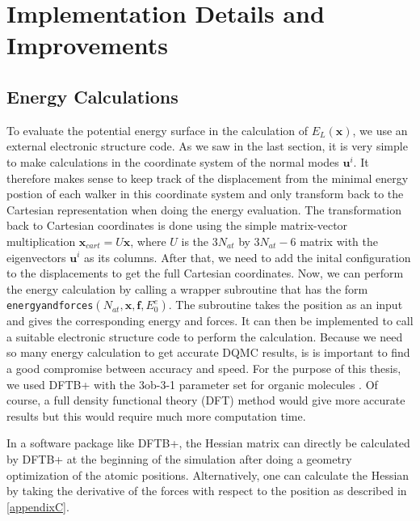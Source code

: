 \documentclass [12pt]{report}
\begin{document}
\section{Implementation Details and Improvements}
\subsection{Energy Calculations}
To evaluate the potential energy surface in the calculation of $E_L(\bm{x})$, we use an external electronic structure code. As we saw in the last section, it is very simple to make calculations in the coordinate system of the normal modes $\bm{u}^i$. It therefore makes sense to keep track of the displacement from the minimal energy postion of each walker in this coordinate system and only transform back to the Cartesian representation when doing the energy evaluation. The transformation back to Cartesian coordinates is done using the simple matrix-vector multiplication $\bm{x}_{cart} = U\bm{x}$, where $U$ is the $3N_{at}$ by $3N_{at} - 6$ matrix with the eigenvectors $\bm{u}^i$ as its columns. After that, we need to add the inital configuration to the displacements to get the full Cartesian coordinates. Now, we can perform the energy calculation by calling a wrapper subroutine that has the form \verb+energyandforces+$(N_{at},\bm{x},\bm{f},E^e_0)$. The subroutine takes the position as an input and gives the corresponding energy and forces. It can then be implemented to call a suitable electronic structure code to perform the calculation. Because we need so many energy calculation to get accurate DQMC results, is is important to find a good compromise between accuracy and speed. For the purpose of this thesis, we used DFTB+ \cite{dftbp,dftbp2} with the 3ob-3-1 parameter set for organic molecules \cite{3ob-3-1}. Of course, a full density functional theory (DFT) method would give more accurate results but this would require much more computation time.

In a software package like DFTB+, the Hessian matrix can directly be calculated by DFTB+ at the beginning of the simulation after doing a geometry optimization of the atomic positions. Alternatively, one can calculate the Hessian by taking the derivative of the forces with respect to the position as described in \ref{appendixC}.
\end{document}
